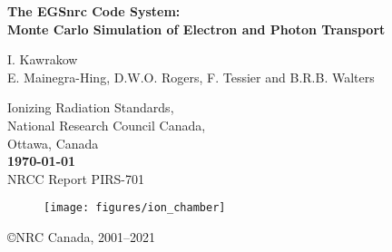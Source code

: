 \documentclass[12pt,twoside]{article}  %
\newcommand{\cen}[1]{\begin{center} #1 \end{center} }
\begin{document}
\begin{center}
{\sffamily \bfseries {\Huge The EGSnrc Code System:}\\
{\Large Monte Carlo Simulation of Electron and Photon Transport
\vspace{5mm}\\}}
\begin{large}
I. Kawrakow\\
E. Mainegra-Hing, D.W.O. Rogers, F. Tessier and B.R.B. Walters\\
\end{large}
Ionizing Radiation Standards,\\
National Research Council Canada,\\
Ottawa, Canada\\

\vspace{10mm}
{\bfseries
\today}
\vspace{5mm}\\
\hfill NRCC Report {\sf PIRS-701} \vspace*{15mm}\\


\begin{figure}[h]
\begin{center}
\leavevmode
\texttt{[image: figures/ion\_chamber]}
\end{center}
\end{figure}
\vfill

\copyright NRC Canada, 2001--2021
\end{center}
\newpage   %
\mbox{}


\newpage
\setlength{\baselineskip}{0.5cm}

\pagestyle{fancy}
\setcounter{page}{1}




\newpage

\tableofcontents

\newpage
\listoffigures
\listoftables

\setlength{\baselineskip}{0.5cm}

\newpage


\end{document}
